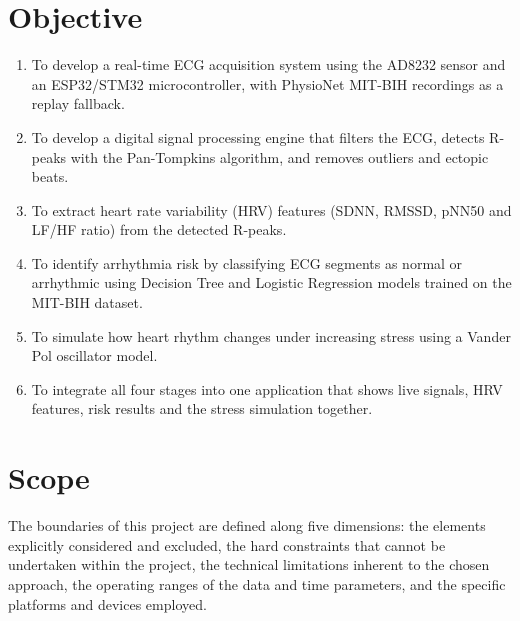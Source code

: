 \section{Objective}
\begin{enumerate}
	\item To develop a real-time ECG acquisition system using the AD8232 sensor and an ESP32/STM32 microcontroller, with PhysioNet MIT-BIH recordings as a replay fallback.
	\item To develop a digital signal processing engine that filters the ECG, detects R-peaks with the Pan-Tompkins algorithm, and removes outliers and ectopic beats.
	\item To extract heart rate variability (HRV) features (SDNN, RMSSD, pNN50 and LF/HF ratio) from the detected R-peaks.
	\item To identify arrhythmia risk by classifying ECG segments as normal or arrhythmic using Decision Tree and Logistic Regression models trained on the MIT-BIH dataset.
	\item To simulate how heart rhythm changes under increasing stress using a Vander Pol oscillator model.
	\item To integrate all four stages into one application that shows live signals, HRV features, risk results and the stress simulation together.
\end{enumerate}

\section{Scope}
\noindent\hspace{1.5em}The boundaries of this project are defined along five
dimensions: the elements explicitly considered and excluded, the hard
constraints that cannot be undertaken within the project, the technical
limitations inherent to the chosen approach, the operating ranges of the data
and time parameters, and the specific platforms and devices employed.


